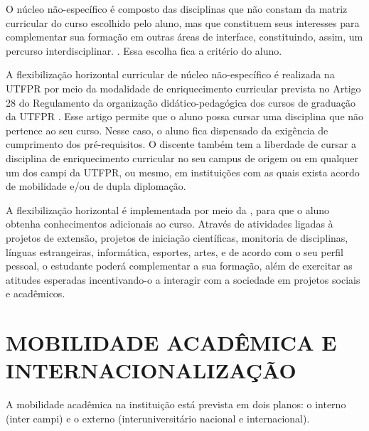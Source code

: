 
O núcleo não-específico é composto das disciplinas que não constam da matriz curricular do curso escolhido pelo aluno, mas que constituem seus interesses para complementar sua formação em outras áreas de interface, constituindo, assim, um percurso interdisciplinar. . Essa escolha fica a critério do aluno. 

A flexibilização horizontal curricular de núcleo não-específico é realizada na UTFPR por meio da modalidade de enriquecimento curricular prevista no Artigo 28 do Regulamento da organização didático-pedagógica dos cursos de graduação da UTFPR \cite{rodp}. Esse artigo permite que o aluno possa cursar uma disciplina que não pertence ao seu curso. Nesse caso, o aluno fica dispensado da exigência de cumprimento dos pré-requisitos. O discente também tem a liberdade de cursar a disciplina de enriquecimento curricular no seu campus de origem ou em qualquer um dos campi da UTFPR, ou mesmo, em instituições com as quais exista acordo de mobilidade e/ou de dupla diplomação.

A flexibilização horizontal é implementada por meio da , para que o aluno obtenha conhecimentos adicionais ao curso. Através de atividades ligadas à projetos de extensão, projetos de iniciação científicas, monitoria de disciplinas, línguas estrangeiras, informática, esportes, artes, e de acordo com o seu perfil pessoal, o estudante poderá complementar a sua formação, além de exercitar as atitudes esperadas incentivando-o a interagir com a sociedade em projetos sociais e acadêmicos.

\section{MOBILIDADE ACADÊMICA E INTERNACIONALIZAÇÃO}

A mobilidade acadêmica na instituição está prevista em dois planos: o interno (inter campi) e o externo (interuniversitário nacional e internacional).

